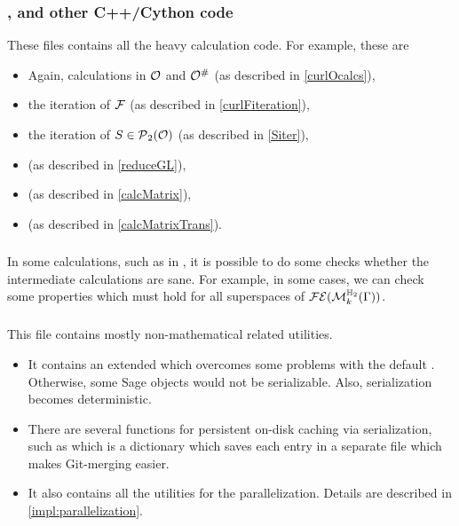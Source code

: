 \subsubsection{,  and other C++/Cython code}
These files contains all the heavy calculation code. For example, these are
\begin{itemize}
\item Again, calculations in $\mathcal{O}$ and $\mathcal{O}^\#$ (as described in \cref{curlOcalcs}),
\item the iteration of $\mathcal{F}$ (as described in \cref{curlFiteration}),
\item the iteration of $S \in \operatorname{\mathcal{P}}_2(\mathcal{O})$ (as described in \cref{Siter}),
\item {} (as described in \cref{reduceGL}),
\item {} (as described in \cref{calcMatrix}),
\item {} (as described in \cref{calcMatrixTrans}).
\end{itemize}

\subsubsection{}
In some calculations, such as  in , it is possible to do some checks whether the intermediate calculations are sane. For example, in some cases, we can check some properties which must hold for all superspaces of $\mathcal{FE}(\operatorname{\mathcal{M}}^{\mathbb{H}_{2}}_{k} (\Gamma))$.

\subsubsection{}
This file contains mostly non-mathematical related utilities.
\begin{itemize}
\item It contains an extended  which overcomes some problems with the default . Otherwise, some Sage objects would not be serializable. Also, serialization becomes deterministic.
\item There are several functions for persistent on-disk caching via serialization, such as  which is a dictionary which saves each entry in a separate file which makes Git-merging easier.
\item It also contains all the utilities for the parallelization. Details are described in \cref{impl:parallelization}.
\end{itemize}

